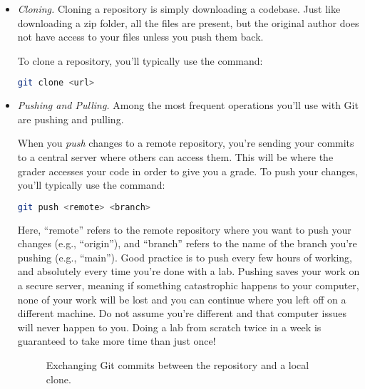 \begin{itemize}
\item \emph{Cloning.}
Cloning a repository is simply downloading a codebase.
Just like downloading a zip folder, all the files are present, but the original author does not have access to your files unless you push them back.

To clone a repository, you'll typically use the command:
\begin{lstlisting}[language=bash]
git clone <url>
\end{lstlisting}

\item \emph{Pushing and Pulling.}
Among the most frequent operations you'll use with Git are pushing and pulling.

When you \emph{push} changes to a remote repository, you're sending your commits to a central server where others can access them.
This will be where the grader accesses your code in order to give you a grade. 
To push your changes, you'll typically use the command:

\begin{lstlisting}[language=bash]
git push <remote> <branch>
\end{lstlisting}

Here, ``remote'' refers to the remote repository where you want to push your changes (e.g., ``origin''), and ``branch'' refers to the name of the branch you're pushing (e.g., ``main'').
Good practice is to push every few hours of working, and absolutely every time you're done with a lab.
Pushing saves your work on a secure server, meaning if something catastrophic happens to your computer, none of your work will be lost and you can continue where you left off on a different machine.
Do not assume you're different and that computer issues will never happen to you.
Doing a lab from scratch twice in a week is guaranteed to take more time than just once!

\begin{figure}[H]
    \centering
    \caption*{Exchanging Git commits between the repository and a local clone.}
\end{figure}


\end{itemize}

